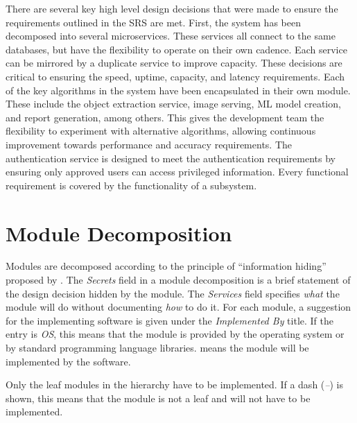 \documentclass[12pt, titlepage]{article}
\begin{document}
There are several key high level design decisions that were made to ensure the requirements outlined in the SRS are met. First, the system has been decomposed into several microservices. These services all connect to 
the same databases, but have the flexibility to operate on their own cadence. Each service can be mirrored by a duplicate service to improve capacity. These decisions are critical to ensuring the speed, uptime, capacity, and latency requirements.
Each of the key algorithms in the system have been encapsulated in their own module. These include the object extraction service, image serving, ML model creation, and report generation, among others. This gives the development team the flexibility to experiment with alternative algorithms, allowing continuous improvement towards performance and accuracy requirements.
The authentication service is designed to meet the authentication requirements by ensuring only approved users can access privileged information.
Every functional requirement is covered by the functionality of a subsystem.


\section{Module Decomposition} \label{SecMD}

Modules are decomposed according to the principle of ``information hiding''
proposed by \citet{ParnasEtAl1984}. The \emph{Secrets} field in a module
decomposition is a brief statement of the design decision hidden by the
module. The \emph{Services} field specifies \emph{what} the module will do
without documenting \emph{how} to do it. For each module, a suggestion for the
implementing software is given under the \emph{Implemented By} title. If the
entry is \emph{OS}, this means that the module is provided by the operating
system or by standard programming language libraries.  \emph{\progname{}} means the
module will be implemented by the \progname{} software.

Only the leaf modules in the hierarchy have to be implemented. If a dash
(\emph{--}) is shown, this means that the module is not a leaf and will not have
to be implemented.
\end{document}
